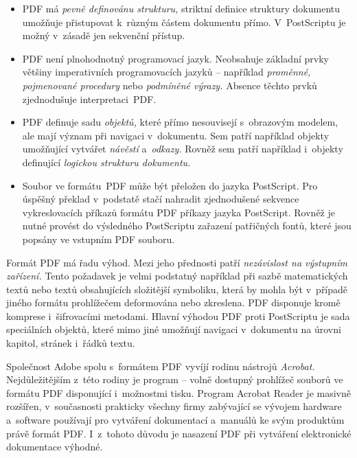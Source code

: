 \documentclass[12pt]{article}
\begin{document}
\begin{itemize}
\item
  PDF má \emph{pevně definovánu strukturu,}
  striktní definice struktury dokumentu umožňuje přistupovat
  k~různým částem dokumentu přímo.
  V~PostScriptu je možný v~zásadě jen sekvenční přístup.
\item
  PDF není plnohodnotný programovací jazyk. Neobsahuje základní prvky většiny
  imperativních programovacích 
  jazyků -- například \emph{proměnné,}
  \emph{pojmenované procedury} 
  nebo \emph{podmíněné výrazy.}
  Absence těchto prvků zjednodušuje interpretaci~PDF.
\item
  PDF definuje sadu \emph{objektů,}
  které přímo nesouvisejí s~obrazovým
  modelem, ale mají význam při navigaci v~dokumentu.
  Sem patří například objekty umožňující vytvářet \emph{návěstí}
  a~\emph{odkazy.} Rovněž sem patří například i~objekty definující
  \emph{logickou strukturu dokumentu.}
\item
  Soubor ve formátu~PDF může být přeložen do jazyka PostScript.
  Pro úspěšný překlad v~podstatě stačí nahradit zjednodušené sekvence
  vykreslovacích příkazů formátu PDF příkazy jazyka PostScript.
  Rovněž je nutné provést do výsledného PostScriptu
  zařazení patřičných fontů, které jsou popsány ve vstupním PDF souboru.
\end{itemize}

Formát PDF má řadu výhod. Mezi jeho přednosti patří
\emph{nezávislost na výstupním zařízení.}
Tento požadavek je velmi podstatný například při sazbě matematických textů
nebo textů obsahujících složitější symboliku, která by mohla být
v~případě jiného formátu prohlížečem deformována nebo zkreslena.
PDF disponuje kromě komprese i~šifrovacími metodami. Hlavní výhodou PDF
proti PostScriptu je sada speciálních objektů, které mimo jiné umožňují
navigaci v~dokumentu na úrovni kapitol, stránek i~řádků textu.

\medskip
Společnost Adobe spolu s~formátem PDF vyvíjí rodinu nástrojů \emph{Acrobat.}
Nejdůležitějším z~této rodiny je program
 -- volně
dostupný prohlížeč souborů ve formátu PDF disponující i~možnostmi tisku.
Program Acrobat Reader je masivně rozšířen, v~současnosti prakticky všechny
firmy zabývající se vývojem hardware a~software používají pro vytváření
dokumentací a~manuálů ke svým produktům právě formát PDF. I~z~tohoto důvodu
je nasazení PDF při vytváření elektronické dokumentace výhodné.
\end{document}
